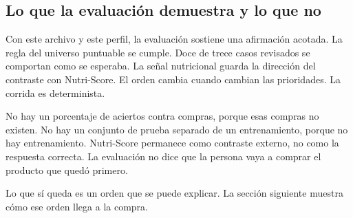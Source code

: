 \subsection{Lo que la evaluación demuestra y lo que no}

Con este archivo y este perfil, la evaluación sostiene una afirmación acotada. La regla del universo puntuable se cumple. Doce de trece casos revisados se comportan como se esperaba. La señal nutricional guarda la dirección del contraste con Nutri-Score. El orden cambia cuando cambian las prioridades. La corrida es determinista.

No hay un porcentaje de aciertos contra compras, porque esas compras no existen. No hay un conjunto de prueba separado de un entrenamiento, porque no hay entrenamiento. Nutri-Score permanece como contraste externo, no como la respuesta correcta. La evaluación no dice que la persona vaya a comprar el producto que quedó primero.

Lo que sí queda es un orden que se puede explicar. La sección siguiente muestra cómo ese orden llega a la compra.
